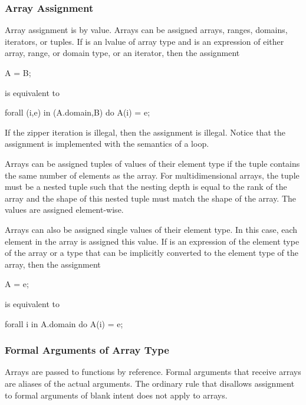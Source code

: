 \subsubsection{Array Assignment}
\label{Array_Assignment}

Array assignment is by value.  Arrays can be assigned arrays, ranges,
domains, iterators, or tuples.  If  is an lvalue of array type
and  is an expression of either array, range, or domain type,
or an iterator, then the assignment
\begin{chapel}
A = B;
\end{chapel}
is equivalent to
\begin{chapel}
forall (i,e) in (A.domain,B) do
  A(i) = e;
\end{chapel}
If the zipper iteration is illegal, then the assignment is illegal.
Notice that the assignment is implemented with the semantics of
a  loop.

Arrays can be assigned tuples of values of their element type if the
tuple contains the same number of elements as the array.  For
multidimensional arrays, the tuple must be a nested tuple such that
the nesting depth is equal to the rank of the array and the shape of
this nested tuple must match the shape of the array.  The values are
assigned element-wise.

Arrays can also be assigned single values of their element type.  In
this case, each element in the array is assigned this value.
If  is an expression of the element type of the array or a
type that can be implicitly converted to the element type of the
array, then the assignment
\begin{chapel}
A = e;
\end{chapel}
is equivalent to
\begin{chapel}
forall i in A.domain do
  A(i) = e;
\end{chapel}

\subsubsection{Formal Arguments of Array Type}
\label{Formal_Arguments_of_Array_Type}

Arrays are passed to functions by reference.  Formal arguments that
receive arrays are aliases of the actual arguments.  The ordinary rule
that disallows assignment to formal arguments of blank intent does not
apply to arrays.

